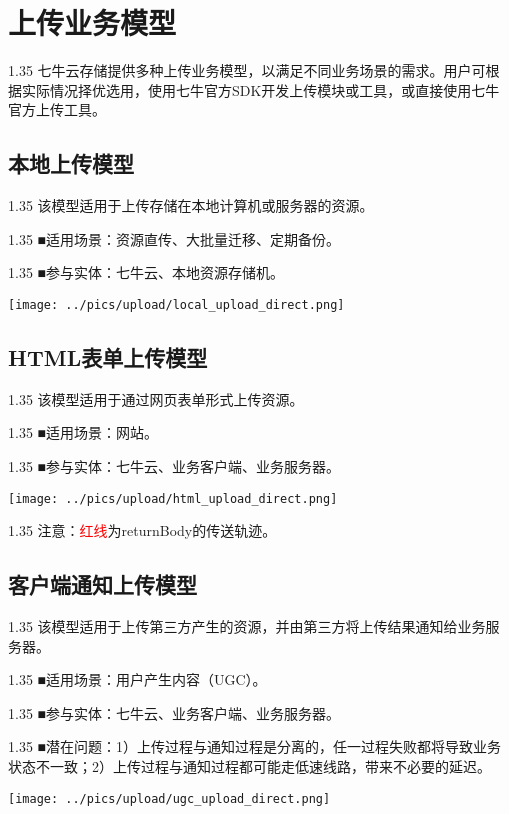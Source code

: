 \documentclass[11pt, oneside]{book}
\newcommand{\qpara}[1]{
\vspace{0.4em}
\begin{spacing}{1.35}
\noindent
#1\par
\end{spacing}
\vspace{0.4em}
}
\begin{document}
\chapter{上传业务模型}

\qpara{七牛云存储提供多种上传业务模型，以满足不同业务场景的需求。用户可根据实际情况择优选用，使用七牛官方SDK开发上传模块或工具，或直接使用七牛官方上传工具。}

\section{本地上传模型}

\qpara{该模型适用于上传存储在本地计算机或服务器的资源。}
\qpara{■\thinspace 适用场景：资源直传、大批量迁移、定期备份。}
\qpara{■\thinspace 参与实体：七牛云、本地资源存储机。}

\begin{center}
\texttt{[image: ../pics/upload/local\_upload\_direct.png]}
\end{center}

\clearpage

\section{HTML表单上传模型}

\qpara{该模型适用于通过网页表单形式上传资源。}
\qpara{■\thinspace 适用场景：网站。}
\qpara{■\thinspace 参与实体：七牛云、业务客户端、业务服务器。}

\begin{center}
\texttt{[image: ../pics/upload/html\_upload\_direct.png]}
\end{center}

\qpara{注意：\textcolor{red}{红线}为returnBody的传送轨迹。}

\clearpage

\section{客户端通知上传模型}

\qpara{该模型适用于上传第三方产生的资源，并由第三方将上传结果通知给业务服务器。}
\qpara{■\thinspace 适用场景：用户产生内容（UGC）。}
\qpara{■\thinspace 参与实体：七牛云、业务客户端、业务服务器。}
\qpara{■\thinspace 潜在问题：1）上传过程与通知过程是分离的，任一过程失败都将导致业务状态不一致；2）上传过程与通知过程都可能走低速线路，带来不必要的延迟。}

\begin{center}
\texttt{[image: ../pics/upload/ugc\_upload\_direct.png]}
\end{center}
\end{document}
